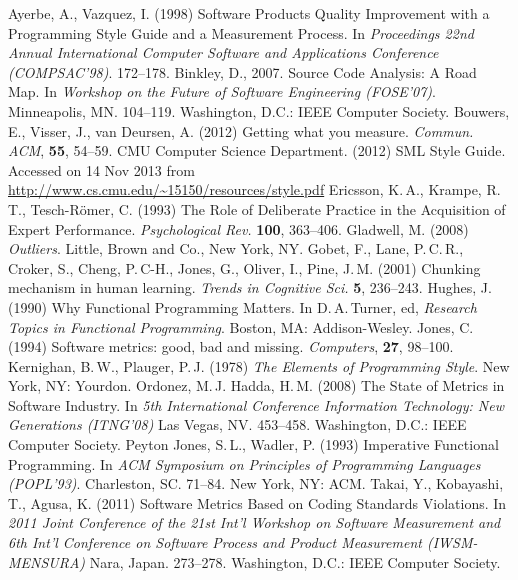 \documentclass[12pt,abstracton]{scrartcl}
\begin{document}
\begin{thebibliography}{99}
 Ayerbe, A., Vazquez, I. (1998) Software Products Quality Improvement with a Programming Style Guide and a Measurement Process. In \emph{Proceedings 22nd Annual International Computer Software and Applications Conference (COMPSAC'98)}. 172--178.
 Binkley, D., 2007. Source Code Analysis: A Road Map. In \emph{Workshop on the Future of Software Engineering (FOSE'07)}. Minneapolis, MN. 104--119. Washington, D.C.: IEEE Computer Society.
 Bouwers, E., Visser, J., van Deursen, A. (2012) Getting what you measure. \emph{Commun. ACM}, \textbf{55}, 54--59.
 CMU Computer Science Department. (2012) SML Style Guide. Accessed on 14 Nov 2013 from \url{http://www.cs.cmu.edu/~15150/resources/style.pdf}
 Ericsson, K.\,A., Krampe, R.\,T., Tesch-R\"{o}mer, C. (1993) The Role of Deliberate Practice in the Acquisition of Expert Performance. \emph{Psychological Rev.} \textbf{100}, 363--406.
 Gladwell, M. (2008) \emph{Outliers}. Little, Brown and Co., New York, NY.
 Gobet, F., Lane, P.\,C.\,R., Croker, S., Cheng, P.\,C-H., Jones, G., Oliver, I., Pine, J.\,M. (2001) Chunking mechanism in human learning. \emph{Trends in Cognitive Sci.} \textbf{5}, 236--243.
 Hughes, J. (1990) Why Functional Programming Matters. In D.\,A.\,Turner, ed, \emph{Research Topics in Functional Programming}. Boston, MA: Addison-Wesley.
 Jones, C. (1994) Software metrics: good, bad and missing. \emph{Computers}, \textbf{27}, 98--100.
 Kernighan, B.\,W., Plauger, P.\,J. (1978) \emph{The Elements of Programming Style}. New York, NY: Yourdon.
 Ordonez, M.\,J. Hadda, H.\,M. (2008) The State of Metrics in Software Industry. In \emph{5th International Conference Information Technology: New Generations (ITNG'08)} Las Vegas, NV. 453--458. Washington, D.C.: IEEE Computer Society.
 Peyton Jones, S.\,L., Wadler, P. (1993) Imperative Functional Programming. In \emph{ACM Symposium on Principles of Programming Languages (POPL'93)}. Charleston, SC. 71--84. New York, NY: ACM.
 Takai, Y., Kobayashi, T., Agusa, K. (2011) Software Metrics Based on Coding Standards Violations. In \emph{2011 Joint Conference of the 21st Int'l Workshop on Software Measurement and 6th Int'l Conference on Software Process and Product Measurement (IWSM-MENSURA)} Nara, Japan. 273--278. Washington, D.C.: IEEE Computer Society.

\end{thebibliography}
\end{document}

